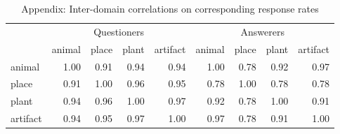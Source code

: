 \documentclass[12pt, floatsintext, jou]{apa6}
\begin{document}
\begin{table}[t!]
\centering
\begin{tabular}{ p{1.5cm} | r | r | r | r |||||| r | r | r | r |}
& \multicolumn{4}{c||||||}{Questioners} & \multicolumn{4}{c}{Answerers} \\
&             animal &     place &     plant &  artifact &            animal &     place &     plant &  artifact \\
\hline
animal &   1.00 &  0.91 & 0.94 & 0.94 & 1.00 & 0.78 & 0.92 &  0.97 \\
\hline
place &    0.91 &  1.00 & 0.96 & 0.95 & 0.78 & 1.00 &  0.78 & 0.78 \\
\hline
plant &    0.94 & 0.96 & 1.00 & 0.97 & 0.92  & 0.78 &  1.00 & 0.91\\
\hline
artifact & 0.94 & 0.95 & 0.97 & 1.00 & 0.97 & 0.78 &  0.91 & 1.00\\
\end{tabular}
\\[1.5pt]
\caption{Appendix: Inter-domain correlations on corresponding response rates} 
\label{table:experiment4correlations}
\end{table}
\end{document}
